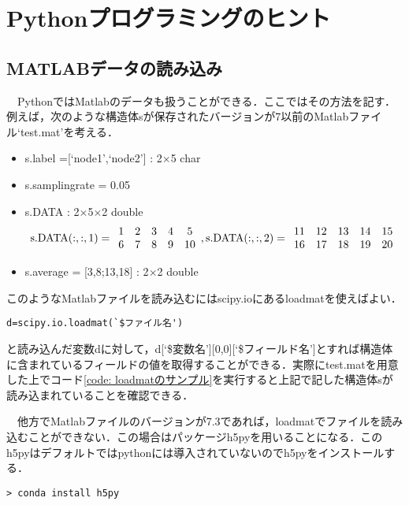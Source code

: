 \section{Pythonプログラミングのヒント}\label{sec: Pythonプログラミングのヒント}


\subsection{MATLABデータの読み込み}
	　PythonではMatlabのデータも扱うことができる．ここではその方法を記す．例えば，次のような構造体sが保存されたバージョンが7以前のMatlabファイル`test.mat'を考える．
	\begin{itemize}
		\item s.label =[`node1',`node2'] : 2$\times$5 char
		\item s.samplingrate = 0.05
		\item s.DATA : 2$\times$5$\times$2 double
			\begin{eqnarray*}
				{\rm s.DATA}(:,:,1)= 
					\begin{array}{ccccc}
						1 & 2 & 3 & 4 & 5\\
						6 & 7 & 8 & 9 & 10\\
					\end{array}, 
				{\rm s.DATA}(:,:,2)=
					\begin{array}{ccccc}
						11 & 12 & 13 & 14 & 15\\		
					16 & 17 & 18 & 19 & 20\\
					\end{array}
			\end{eqnarray*}
		\item s.average = [3,8;13,18] : 2$\times$2 double
	\end{itemize}
	このようなMatlabファイルを読み込むにはscipy.ioにあるloadmatを使えばよい．
\begin{lstlisting}[style=python]
d=scipy.io.loadmat(`$ファイル名')
\end{lstlisting}
	と読み込んだ変数dに対して，d[`\$変数名'][0,0][`\$フィールド名']とすれば構造体に含まれているフィールドの値を取得することができる．実際にtest.matを用意した上でコード\ref{code: loadmatのサンプル}を実行すると上記で記した構造体sが読み込まれていることを確認できる．
	
	　他方でMatlabファイルのバージョンが7.3であれば，loadmatでファイルを読み込むことができない．この場合はパッケージh5pyを用いることになる．このh5pyはデフォルトではpythonには導入されていないのでh5pyをインストールする．	\begin{lstlisting}[style=cmdline]
> conda install h5py
\end{lstlisting}
